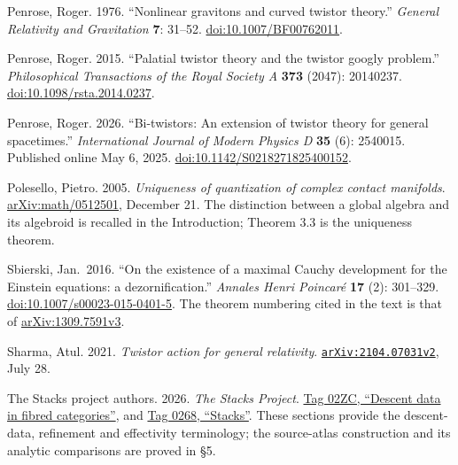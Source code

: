 \documentclass[
  english,
  11pt,
  reqno]{amsart}
\begin{document}
\begin{thebibliography}{}
Penrose, Roger. 1976. ``Nonlinear gravitons and curved twistor theory.''
\emph{General Relativity and Gravitation} \textbf{7}: 31--52.
\href{https://doi.org/10.1007/BF00762011}{doi:10.1007/BF00762011}.

\protect{}\label{ref:Penrose2015}

Penrose, Roger. 2015. ``Palatial twistor theory and the twistor googly
problem.'' \emph{Philosophical Transactions of the Royal Society A}
\textbf{373} (2047): 20140237.
\href{https://doi.org/10.1098/rsta.2014.0237}{doi:10.1098/rsta.2014.0237}.

\protect{}\label{ref:Penrose2026}

Penrose, Roger. 2026. ``Bi-twistors: An extension of twistor theory for
general spacetimes.'' \emph{International Journal of Modern Physics D}
\textbf{35} (6): 2540015. Published online May 6, 2025.
\href{https://doi.org/10.1142/S0218271825400152}{doi:10.1142/S0218271825400152}.

\protect{}\label{ref:Polesello2005}

Polesello, Pietro. 2005. \emph{Uniqueness of quantization of complex
contact manifolds}.
\href{https://arxiv.org/abs/math/0512501}{arXiv:math/0512501}, December
21. The distinction between a global algebra and its algebroid is
recalled in the Introduction; Theorem 3.3 is the uniqueness theorem.

\protect{}\label{ref:Sbierski2016}

Sbierski, Jan.~2016. ``On the existence of a maximal Cauchy development
for the Einstein equations: a dezornification.'' \emph{Annales Henri
Poincaré} \textbf{17} (2): 301--329.
\href{https://doi.org/10.1007/s00023-015-0401-5}{doi:10.1007/s00023-015-0401-5}.
The theorem numbering cited in the text is that of
\href{https://arxiv.org/abs/1309.7591v3}{arXiv:1309.7591v3}.

\protect{}\label{ref:Sharma2021}

Sharma, Atul. 2021. \emph{Twistor action for general relativity}.
\href{https://arxiv.org/abs/2104.07031v2}{\nolinkurl{arXiv:2104.07031v2}}, July 28.

\protect{}\label{ref:StacksProject}

The Stacks project authors. 2026. \emph{The Stacks Project}.
\href{https://stacks.math.columbia.edu/tag/02ZC}{Tag 02ZC, ``Descent
data in fibred categories''}, and
\href{https://stacks.math.columbia.edu/tag/0268}{Tag 0268, ``Stacks''}.
These sections provide the descent-data, refinement and effectivity
terminology; the source-atlas construction and its analytic comparisons
are proved in §5.


\end{thebibliography}
\end{document}
